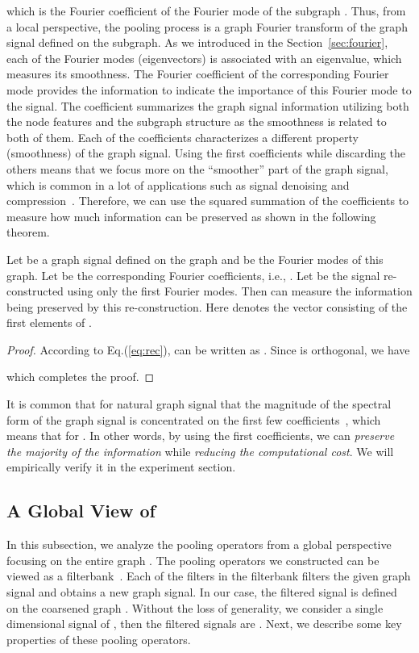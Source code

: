 \documentclass[sigconf]{acmart}
\newcommand{\pooling}{{\sf {EigenPooling}}}
\begin{document}
which is the Fourier coefficient of the Fourier mode  of the subgraph . Thus, from a local perspective, the pooling process is a graph Fourier transform of the graph signal defined on the subgraph. As we introduced in the Section~\ref{sec:fourier}, each of the Fourier modes (eigenvectors) is associated with an eigenvalue, which measures its smoothness. The Fourier coefficient of the corresponding Fourier mode provides the information to indicate the importance of this Fourier mode to the signal. The coefficient summarizes the graph signal information utilizing both the node features and the subgraph structure as the smoothness is related to both of them. Each of the coefficients characterizes a different property (smoothness) of the graph signal. Using the first  coefficients while discarding the others means that we focus more on the ``smoother'' part of the graph signal, which is common in a lot of applications such as signal denoising and compression~\cite{tremblay2016subgraph,chen2014signal,narang2012perfect}. Therefore, we can use the squared summation of the coefficients to measure how much information can be preserved as shown in the following theorem.  

\begin{theorem}
Let  be a graph signal defined on the graph  and  be the Fourier modes of this graph. Let  be the corresponding Fourier coefficients, i.e., . Let  be the signal re-constructed using only the first  Fourier modes. Then  can measure the information being preserved by this re-construction. Here  denotes the vector consisting of the first  elements of .

\end{theorem}
\begin{proof}
According to Eq.(\ref{eq:rec}),  can be written as . Since  is orthogonal, we have

which completes the proof.
\end{proof}

It is common that for natural graph signal that the magnitude of the spectral form of the graph signal is concentrated on the first few coefficients~\cite{sandryhaila2013discrete,shuman2013emerging}, which means that  for . In other words, by using the first  coefficients, we can \textit{preserve the majority of the information} while \textit{reducing the computational cost}. We will empirically verify it in the experiment section.

\subsection{A Global View of \pooling} \label{sec:global}
In this subsection, we analyze the pooling operators from a global perspective focusing on the entire graph . The pooling operators we constructed can be viewed as a filterbank~\cite{tremblay2016subgraph}. Each of the filters in the filterbank filters the given graph signal and obtains a new graph signal. In our case, the filtered signal is defined on the coarsened graph . Without the loss of generality, we consider a single dimensional signal  of , then the filtered signals are . Next, we describe some key properties of these pooling operators. 
\end{document}
